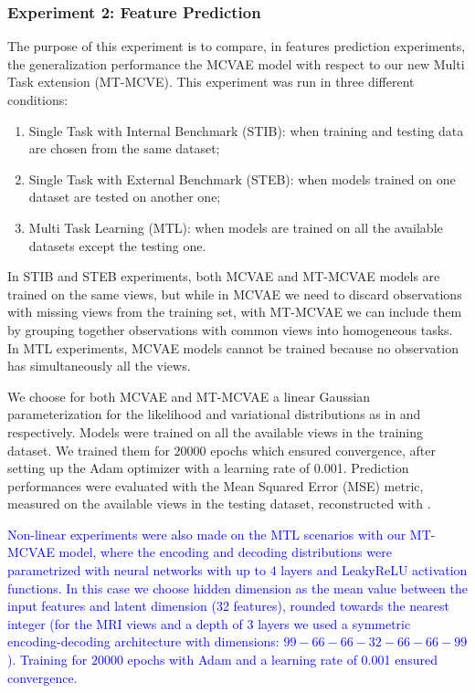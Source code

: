 \subsubsection{Experiment 2: Feature Prediction}
\label{ssec:feats}

The purpose of this experiment is to compare, in features prediction experiments, the generalization performance the MCVAE model with respect to our new Multi Task extension (MT-MCVE).
This experiment was run in three different conditions:
%
\begin{enumerate}
\item Single Task with Internal Benchmark (STIB): when training and testing data are chosen from the same dataset;
%
\item Single Task with External Benchmark (STEB): when models trained on one dataset are tested on another one;
%
\item Multi Task Learning (MTL): when models are trained on all the available datasets except the testing one.
%
\end{enumerate}
%
In STIB and STEB experiments, both MCVAE and MT-MCVAE models are trained on the same views,
but while in MCVAE we need to discard observations with missing views from the training set,
with MT-MCVAE we can include them by grouping together observations with common views into homogeneous tasks.
In MTL experiments, MCVAE models cannot be trained because no observation has simultaneously all the views.

We choose for both MCVAE and MT-MCVAE a linear Gaussian parameterization for the likelihood and variational distributions as in  and  respectively.
Models were trained on all the available views in the training dataset. %
We trained them for $20000$ epochs which ensured convergence, after setting up the Adam optimizer with a learning rate of 0.001.
Prediction performances were evaluated with the Mean Squared Error (MSE) metric, measured on the available views in the testing dataset, reconstructed with .

\textcolor{blue}{
	Non-linear experiments were also made on the MTL scenarios with our MT-MCVAE model, where the encoding and decoding distributions were parametrized with neural networks with up to $4$ layers and LeakyReLU activation functions.
	In this case we choose hidden dimension as the mean value between the input features and latent dimension (32 features), rounded towards the nearest integer
	(\eg for the MRI views and a depth of $3$ layers we used a symmetric encoding-decoding architecture with dimensions: $99-66-66-32-66-66-99$).
	Training for $20000$ epochs with Adam and a learning rate of 0.001 ensured convergence.
}

